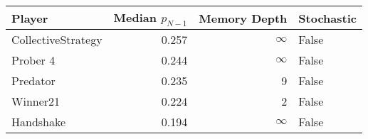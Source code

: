 \begin{tabular}{lrrl}
\toprule
             Player &  Median $p_{N-1}$ &  Memory Depth & Stochastic \\
\midrule
 CollectiveStrategy &             0.257 &            \(\infty\) &      False \\
           Prober 4 &             0.244 &            \(\infty\) &      False \\
           Predator &             0.235 &             9 &      False \\
           Winner21 &             0.224 &             2 &      False \\
          Handshake &             0.194 &            \(\infty\) &      False \\
\bottomrule
\end{tabular}
